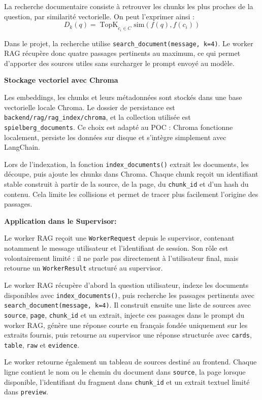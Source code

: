\documentclass[a4paper,11pt,english,openany]{book}
\begin{document}
La recherche documentaire consiste à retrouver les chunks les plus proches de la question, par similarité vectorielle. On peut l'exprimer ainsi :
\begin{equation}
D_k(q) = \operatorname{TopK}_{c_i \in C} \text{sim}(f(q), f(c_i))
\end{equation}

Dans le projet, la recherche utilise \texttt{search\_document(message, k=4)}. Le worker RAG récupère donc quatre passages pertinents au maximum, ce qui permet d'apporter des sources utiles sans surcharger le prompt envoyé au modèle.

\textbf{Stockage vectoriel avec Chroma}

Les embeddings, les chunks et leurs métadonnées sont stockés dans une base vectorielle locale Chroma. Le dossier de persistance est \texttt{backend/rag/rag\_index/chroma}, et la collection utilisée est \texttt{spielberg\_documents}. Ce choix est adapté au POC : Chroma fonctionne localement, persiste les données sur disque et s'intègre simplement avec LangChain.

Lors de l'indexation, la fonction \texttt{index\_documents()} extrait les documents, les découpe, puis ajoute les chunks dans Chroma. Chaque chunk reçoit un identifiant stable construit à partir de la source, de la page, du \texttt{chunk\_id} et d'un hash du contenu. Cela limite les collisions et permet de tracer plus facilement l'origine des passages.

\textbf{Application dans le Supervisor:}

Le worker RAG reçoit une \texttt{WorkerRequest} depuis le supervisor, contenant notamment le message utilisateur et l'identifiant de session. Son rôle est volontairement limité : il ne parle pas directement à l'utilisateur final, mais retourne un \texttt{WorkerResult} structuré au supervisor.

Le worker RAG récupère d'abord la question utilisateur, indexe les documents disponibles avec \texttt{index\_documents()}, puis recherche les passages pertinents avec \texttt{search\_document(message, k=4)}. Il construit ensuite une liste de sources avec \texttt{source}, \texttt{page}, \texttt{chunk\_id} et un extrait, injecte ces passages dans le prompt du worker RAG, génère une réponse courte en français fondée uniquement sur les extraits fournis, puis retourne au supervisor une réponse structurée avec \texttt{cards}, \texttt{table}, \texttt{raw} et \texttt{evidence}.

Le worker retourne également un tableau de sources destiné au frontend. Chaque ligne contient le nom ou le chemin du document dans \texttt{source}, la page lorsque disponible, l'identifiant du fragment dans \texttt{chunk\_id} et un extrait textuel limité dans \texttt{preview}.
\end{document}
